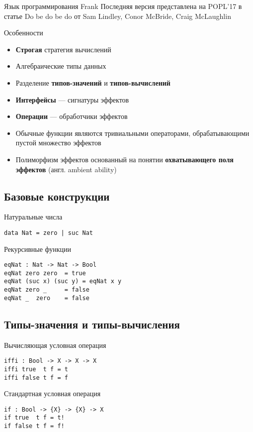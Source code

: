 \begin{frame}{Язык программирования Frank}
  Последняя версия представлена на POPL'17 в статье Do be do be do от Sam Lindley, Conor McBride, Craig McLaughlin
  \begin{block}{Особенности}
    \begin{itemize}
      \item \textbf{Строгая} стратегия вычислений
      \item Алгебраические типы данных
      \item Разделение \textbf{типов-значений} и \textbf{типов-вычислений}
      \item \textbf{Интерфейсы} --- сигнатуры эффектов
      \item \textbf{Операции} --- обработчики эффектов
      \item Обычные функции являются тривиальными операторами, обрабатывающими пустой множество эффектов
      \item Полиморфизм эффектов основанный на понятии \textbf{охватывающего поля эффектов} (англ. ambient ability)
    \end{itemize}
  \end{block}
\end{frame}

\subsection{Базовые конструкции}

\begin{frame}[fragile]{}
\begin{block}{Натуральные числа}
\begin{verbatim}
data Nat = zero | suc Nat
\end{verbatim}
\end{block}
\begin{block}{Рекурсивные функции}
\begin{verbatim}
eqNat : Nat -> Nat -> Bool
eqNat zero zero  = true
eqNat (suc x) (suc y) = eqNat x y
eqNat zero _     = false
eqNat _  zero    = false
\end{verbatim}
\end{block}
\end{frame}

\subsection{Типы-значения и типы-вычисления}

\begin{frame}[fragile]{}
\begin{block}{Вычисляющая условная операция}
\begin{verbatim}
iffi : Bool -> X -> X -> X
iffi true  t f = t
iffi false t f = f
\end{verbatim}
\end{block}
\begin{block}{Стандартная условная операция}
\begin{verbatim}
if : Bool -> {X} -> {X} -> X
if true  t f = t!
if false t f = f!
\end{verbatim}
\end{block}
\end{frame}

